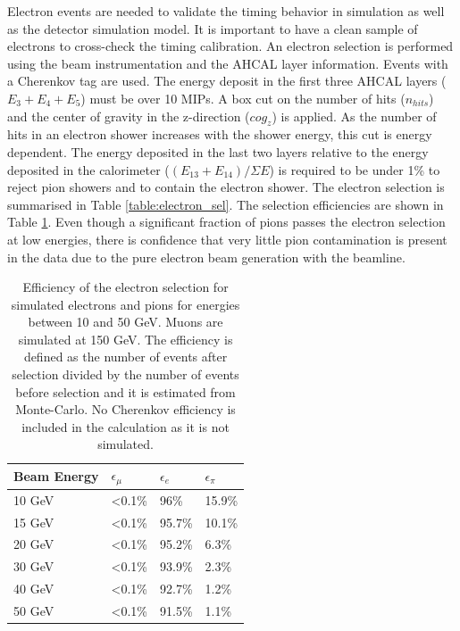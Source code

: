 \documentclass{JINST}
\begin{document}
Electron events are needed to validate the timing behavior in simulation as well as the detector simulation model. It is important to have a clean sample of electrons to cross-check the timing calibration. An electron selection is performed using the beam instrumentation and the AHCAL layer information. Events with a Cherenkov tag are used. The energy deposit in the first three AHCAL layers ($E_3+E_4+E_5$) must be over 10 MIPs. A box cut on the number of hits ($n_{hits}$) and the center of gravity in the z-direction ($cog_{z}$) is applied. As the number of hits in an electron shower increases with the shower energy, this cut is energy dependent. The energy deposited in the last two layers relative to the energy deposited in the calorimeter ($(E_{13}+E_{14})/\Sigma E$) is required to be under 1\% to reject pion showers and to contain the electron shower. The electron selection is summarised in Table \ref{table:electron_sel}. The selection efficiencies are shown in Table \ref{table:eff_electron}. Even though a significant fraction of pions passes the electron selection at low energies, there is confidence that very little pion contamination is present in the data due to the pure electron beam generation with the beamline.

\begin{table}[htb!]
	\centering
	\caption{Efficiency of the electron selection for simulated electrons and pions for energies between 10 and 50 GeV. Muons are simulated at 150 GeV. The efficiency is defined as the number of events after selection divided by the number of events before selection and it is estimated from Monte-Carlo. No Cherenkov efficiency is included in the calculation as it is not simulated.}
	\label{table:eff_electron}
	\begin{tabular}{@{} llll @{}}
		\toprule
		\textbf{Beam Energy} & \textbf{$\epsilon_{\mu}$} & \textbf{$\epsilon_{e}$} & \textbf{$\epsilon_{\pi}$}\\
		\midrule
		10 GeV & <0.1\% & 96\% & 15.9\%\\
		15 GeV & <0.1\% & 95.7\% & 10.1\%\\
		20 GeV & <0.1\% & 95.2\% & 6.3\%\\
		30 GeV & <0.1\% & 93.9\% & 2.3\%\\
		40 GeV & <0.1\% & 92.7\% & 1.2\%\\
		50 GeV & <0.1\% & 91.5\% & 1.1\%\\
		\bottomrule
	\end{tabular}
\end{table}
\end{document}
